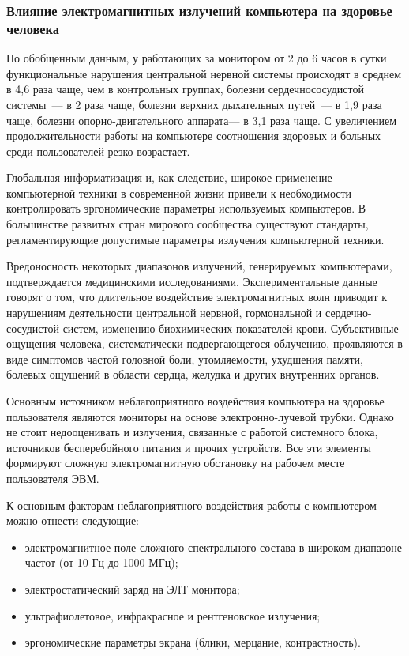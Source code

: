 \subsubsection{Влияние электромагнитных излучений компьютера на здоровье человека}
По обобщенным данным, у работающих за монитором от 2 до 6 часов в сутки функциональные нарушения центральной нервной системы происходят в среднем в 4,6 раза чаще, чем в контрольных группах, болезни сердечнососудистой системы~--- в 2 раза чаще, болезни верхних дыхательных путей~--- в 1,9 раза чаще, болезни опорно-двигательного аппарата--- в 3,1 раза чаще.
С увеличением продолжительности работы на компьютере соотношения здоровых и больных среди пользователей резко возрастает.

Глобальная информатизация и, как следствие, широкое применение компьютерной техники в современной жизни привели к необходимости контролировать эргономические параметры используемых компьютеров.
В большинстве развитых стран мирового сообщества существуют стандарты, регламентирующие допустимые параметры излучения компьютерной техники.

Вредоносность некоторых диапазонов излучений, генерируемых компьютерами, подтверждается медицинскими исследованиями.
Экспериментальные данные говорят о том, что длительное воздействие электромагнитных волн приводит к нарушениям деятельности центральной нервной, гормональной и сердечно-сосудистой систем, изменению биохимических показателей крови.
Субъективные ощущения человека, систематически подвергающегося облучению, проявляются в виде симптомов частой головной боли, утомляемости, ухудшения памяти, болевых ощущений в области сердца, желудка и других внутренних органов.

Основным источником неблагоприятного воздействия компьютера на здоровье пользователя являются мониторы на основе электронно-лучевой трубки.
Однако не стоит недооценивать и излучения, связанные с работой системного блока, источников бесперебойного питания и прочих устройств.
Все эти элементы формируют сложную электромагнитную обстановку на рабочем месте пользователя ЭВМ.

К основным факторам неблагоприятного воздействия работы с компьютером можно отнести следующие:
\begin{itemize}
  \item электромагнитное поле сложного спектрального состава в широком диапазоне частот (от 10 Гц до 1000 МГц);
  \item электростатический заряд на ЭЛТ монитора;
  \item ультрафиолетовое, инфракрасное и рентгеновское излучения;
  \item эргономические параметры экрана (блики, мерцание, контрастность).
\end{itemize}

